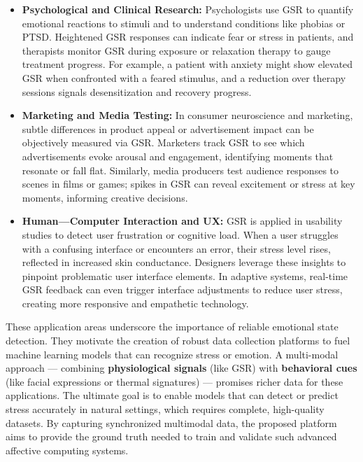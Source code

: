 \documentclass[11pt,a4paper]{report}
\begin{document}
\begin{itemize}
\item \textbf{Psychological and Clinical Research:} Psychologists use GSR to
  quantify emotional reactions to stimuli and to understand conditions
  like phobias or PTSD. Heightened GSR responses can indicate fear or
  stress in patients, and therapists monitor GSR during exposure or
  relaxation therapy to gauge treatment
  progress\cite{AppleHealthWatch2019}\cite{SamsungHealth2020}.
  For example, a patient with anxiety might show elevated GSR when
  confronted with a feared stimulus, and a reduction over therapy
  sessions signals desensitization and recovery progress.
\item \textbf{Marketing and Media Testing:} In consumer neuroscience and
  marketing, subtle differences in product appeal or advertisement
  impact can be objectively measured via GSR. Marketers track GSR to see
  which advertisements evoke arousal and engagement, identifying moments
  that resonate or fall
  flat\cite{Fowles1981}\cite{Healey2005}.
  Similarly, media producers test audience responses to scenes in films
  or games; spikes in GSR can reveal excitement or stress at key
  moments, informing creative decisions.
\item \textbf{Human---Computer Interaction and UX:} GSR is applied in usability
  studies to detect user frustration or cognitive load. When a user
  struggles with a confusing interface or encounters an error, their
  stress level rises, reflected in increased skin
  conductance\cite{Picard2001}.
  Designers leverage these insights to pinpoint problematic user
  interface elements. In adaptive systems, real-time GSR feedback can
  even trigger interface adjustments to reduce user stress, creating
  more responsive and empathetic technology.

\end{itemize}
These application areas underscore the importance of reliable emotional
state detection. They motivate the creation of robust data collection
platforms to fuel machine learning models that can recognize stress or
emotion. A multi-modal approach --- combining \textbf{physiological signals}
(like GSR) with \textbf{behavioral cues} (like facial expressions or thermal
signatures) --- promises richer data for these applications. The ultimate
goal is to enable models that can detect or predict stress accurately in
natural settings, which requires complete, high-quality datasets.
By capturing synchronized multimodal data, the proposed platform aims to
provide the ground truth needed to train and validate such advanced
affective computing systems.
\end{document}
